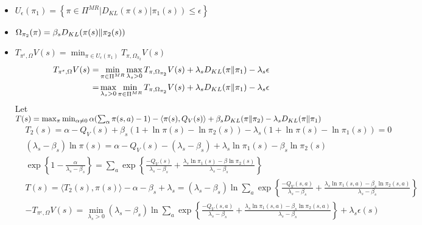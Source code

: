\documentclass[a4paper]{article}
\begin{document}
\begin{itemize}
    \item $ U_{\epsilon}(\pi_1) = \left\{ \pi \in \Pi^{MR} | D_{KL}\left( \pi(s) | \pi_1(s) \right) \le \epsilon \right\} $
    \item $ \Omega_{\pi_2}(\pi) = \beta_s D_{KL}(\pi(s) \Arrowvert \pi_2(s)) $
    \item $ T_{\pi^{\epsilon}, \Omega}V(s) = \min_{\pi \in U_{\epsilon}(\pi_1)} T_{\pi, \Omega_{\pi_2}} V(s) $
        \begin{align*}
            T_{\pi^{\epsilon}, \Omega}V(s) =& \min_{\pi\in\Pi^{MR}} \max_{\lambda_s > 0} T_{\pi, \Omega_{\pi_2}}V(s) + \lambda_s D_{KL}(\pi \Arrowvert \pi_1) - \lambda_s \epsilon\\
            =& \max_{\lambda_s > 0} \min_{\pi\in\Pi^{MR}} T_{\pi, \Omega_{\pi_2}}V(s) + \lambda_s D_{KL}(\pi \Arrowvert \pi_1) - \lambda_s \epsilon\\
        \end{align*}
        Let $ T(s) = \max_{\pi} \min_{\alpha \ne 0}\alpha( \sum^{}_{\alpha} \pi(s,a) - 1) 
        - \langle \pi(s), Q_V(s) \rangle + \beta_s D_{KL}(\pi \Arrowvert \pi_2) - \lambda_s D_{KL}(\pi \Arrowvert \pi_1) $
        \begin{align*}
            &T_2(s) = \alpha - Q_V(s) + \beta_s\left(1 + \ln \pi(s) - \ln\pi_2(s)\right)
            - \lambda_s \left( 1 + \ln \pi(s) - \ln\pi_1(s) \right) = 0\\
            & (\lambda_s - \beta_s)\ln \pi(s) = \alpha - Q_V(s) - (\lambda_s - \beta_s) + \lambda_s \ln \pi_1(s) - \beta_s \ln \pi_2(s)\\
            & \exp\left\{ 1 - \frac{\alpha}{\lambda_s - \beta_s}  \right\} = \sum^{}_{a} \exp\left\{ \frac{-Q_V(s)}{\lambda_s - \beta_s} + \frac{\lambda_s \ln \pi_1(s) - \beta \ln \pi_2(s)}{\lambda_s - \beta_s}  \right\}\\
            & T(s) = \langle T_2(s), \pi(s) \rangle - \alpha - \beta_s + \lambda_s
            = (\lambda_s - \beta_s) \ln\sum^{}_{a} \exp\left\{ \frac{-Q_V(s,a)}{\lambda_s - \beta_s} + \frac{\lambda_s \ln \pi_1(s, a) - \beta_s \ln \pi_2(s,a)}{\lambda_s - \beta_s}  \right\}\\
            & -T_{\pi^{\epsilon}, \Omega}V(s) = \min_{\lambda_s > 0} (\lambda_s - \beta_s) \ln\sum^{}_{a} \exp\left\{ \frac{-Q_V(s,a)}{\lambda_s - \beta_s} + \frac{\lambda_s \ln \pi_1(s, a) - \beta_s \ln \pi_2(s,a)}{\lambda_s - \beta_s}  \right\} + \lambda_s \epsilon(s)
        \end{align*}
\end{itemize}
\end{document}
